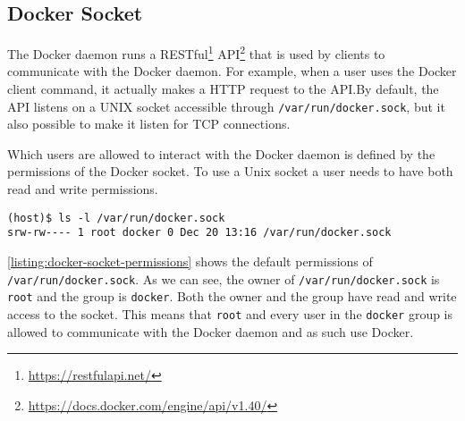 \subsection{Docker Socket}\label{background:docker-socket}
The Docker daemon runs a RESTful\footnote{\url{https://restfulapi.net/}} API\footnote{\url{https://docs.docker.com/engine/api/v1.40/}} that is used by clients to communicate with the Docker daemon. For example, when a user uses the Docker client command, it actually makes a HTTP request to the API.\@ By default, the API listens on a UNIX socket accessible through \lstinline{/var/run/docker.sock}, but it also possible to make it listen for TCP connections.

\medskip

Which users are allowed to interact with the Docker daemon is defined by the permissions of the Docker socket. To use a Unix socket a user needs to have both read and write permissions.

\begin{lstlisting}[caption={Default Docker socket permissions.},captionpos=b,label={listing:docker-socket-permissions}]
(host)$ ls -l /var/run/docker.sock
srw-rw---- 1 root docker 0 Dec 20 13:16 /var/run/docker.sock
\end{lstlisting}

\autoref{listing:docker-socket-permissions} shows the default permissions of \lstinline{/var/run/docker.sock}. As we can see, the owner of \lstinline{/var/run/docker.sock} is \lstinline{root} and the group is \lstinline{docker}. Both the owner and the group have read and write access to the socket. This means that \lstinline{root} and every user in the \lstinline{docker} group is allowed to communicate with the Docker daemon and as such use Docker.
